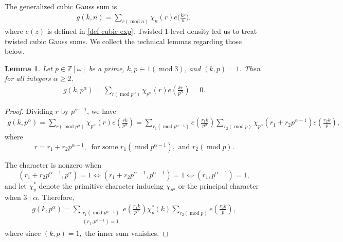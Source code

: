 \documentclass[11pt]{amsart}
\newtheorem{lemma}[prop]{Lemma}
\numberwithin{equation}{section}
\newcommand{\mymod}[1]{(\operatorname{mod} #1)}
\theoremstyle{remark}
\begin{document}
The generalized cubic Gauss sum is 
\begin{align}\label{def cubic Gauss sum}    
g(k, n)=\sum_{r\mymod{n}}\chi_n(r)e\bigg(\frac{kr}{n}\bigg),
\end{align}
where $e(z)$ is defined in \eqref{def cubic exp}.
Twisted 1-level density led us to treat twisted cubic Gauss sums. We collect the technical lemmas regarding those below. 
\begin{lemma}
\label{lemma gauss sum with p^2 vanishes}
Let $p\in \mathbb{Z}[\omega]$ be a prime, $k, p\equiv 1\mymod{3}$, and $(k, p)=1.$ Then for all integers $\alpha\ge 2,$
    \begin{align*}
        g(k, p^\alpha)=\sum_{r\mymod{p^\alpha}}\chi_{p^\alpha}(r)e\left(\frac{kr}{p^\alpha}\right) = 0.
    \end{align*}
\end{lemma}
\begin{proof}
Dividing $r$ by $p^{\alpha-1}$, we have
    \begin{align*}
        g(k, p^\alpha)
        =
        \sum_{r\mymod{p^\alpha}}\chi_{p^\alpha}(r)e\left(\frac{rk}{p^\alpha}\right)
        =
        \sum_{r_1 \mymod{p^{\alpha-1}}}e\left(\frac{r_1k}{p^\alpha}\right)
         \sum_{r_2\mymod{p}}\chi_{p^\alpha}(r_1+r_2{p^{\alpha-1}})e\left(\frac{r_2k}{p}\right),
    \end{align*}
    where
    $$r=r_1+r_2{p^{\alpha-1}}, \ \text{ for some } r_1\mymod{p^{\alpha-1}}, \text{ and } r_2\mymod{p}.$$
    
    The character is nonzero when $$(r_1+r_2p^{\alpha-1}, p^\alpha)=1 \iff (r_1+r_2p^{\alpha-1}, p^{\alpha-1})=1 \iff (r_1, p^{\alpha-1})=1,$$ and let $\chi_p^*$ denote the primitive character inducing $\chi_{p^\alpha}$ or the principal character when $3\mid \alpha$. 
    Therefore,
    \begin{align*}
        g(k, p^\alpha)
        =
        \sum_{\substack{r_1 \mymod{p^{\alpha-1}}\\(r_1, p^{\alpha-1})=1}}e\left(\frac{r_1k}{p^\alpha}\right)\chi_p^*(k)
         \sum_{r_2\mymod{p}}e\left(\frac{r_2k}{p}\right),
    \end{align*}
    where since $(k, p)=1,$ the inner sum vanishes.
\end{proof}
\end{document}
